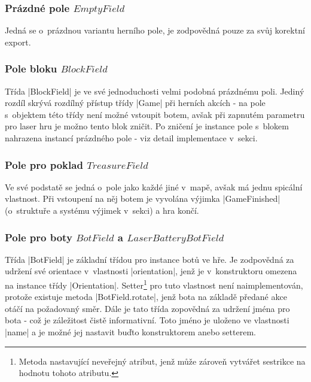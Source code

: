 \subsubsection{Prázdné pole $EmptyField$}

Jedná se o~prázdnou variantu herního pole, je zodpovědná pouze za svůj korektní export.

\subsubsection{Pole bloku $BlockField$}

Třída \ic|BlockField| je ve své jednoduchosti velmi podobná prázdnému poli. Jediný rozdíl skrývá rozdílný přístup třídy \ic|Game| při herních akcích - na pole s~objektem této třídy není možné vstoupit botem, avšak při zapnutém parametru pro laser hru je možno tento blok zničit. Po zničení je instance pole s~blokem nahrazena instancí prázdného pole - viz detail implementace v~sekci.

\subsubsection{Pole pro poklad $TreasureField$}

Ve své podstatě se jedná o~pole jako každé jiné v~mapě, avšak má jednu spicální vlastnost. Při vstoupení na něj botem je vyvolána výjimka \ic|GameFinished| (o~struktuře a systému výjimek v~sekci) a hra končí. 

\subsubsection{Pole pro boty $BotField$ a $LaserBatteryBotField$}

Třída \ic|BotField| je základní třídou pro instance botů ve hře. Je zodpovědná za udržení své orientace v~vlastnosti \ic|orientation|, jenž je v~konstruktoru omezena na instance třídy \ic|Orientation|. Setter\footnote{Metoda nastavující neveřejný atribut, jenž může zároveň vytvářet sestrikce na hodnotu tohoto atributu.} pro tuto vlastnost není naimplementován, protože existuje metoda \ic|BotField.rotate|, jenž bota na základě předané akce otáčí na požadovaný směr. Dále je tato třída zopovědná za udržení jména pro bota - což je záležitost čistě informativní. Toto jméno je uloženo ve vlastnosti \ic|name| a je možné jej nastavit buďto konstruktorem anebo setterem.

